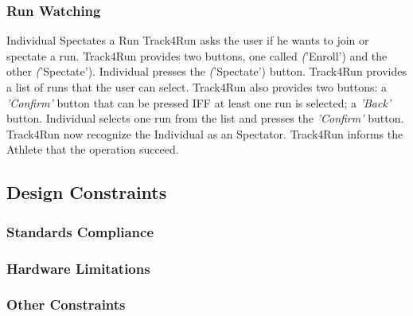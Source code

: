 \documentclass[a4paper]{article}
\begin{document}
        \subsubsection{Run Watching}
        
        \begin{usecase}{Individual Spectates a Run}
              {Track4Run asks the user if he wants to join or spectate a run. Track4Run provides two buttons, one called \textit('Enroll') and the other \textit('Spectate').}
              {Individual presses the \textit('Spectate') button.}
              {Track4Run provides a list of runs that the user can select. Track4Run also provides two buttons: a \textit{'Confirm'} button that can be pressed IFF at least one run is selected; a \textit{'Back'} button.}
              {Individual selects one run from the list and presses the \textit{'Confirm'} button.}
              {Track4Run now recognize the Individual as an Spectator.}
              {Track4Run informs the Athlete that the operation succeed.}
        \end{usecase}
        
    
    \subsection{Design Constraints}
    
        \subsubsection{Standards Compliance}
        
        \subsubsection{Hardware Limitations}
        
        \subsubsection{Other Constraints}
    
\end{document}
